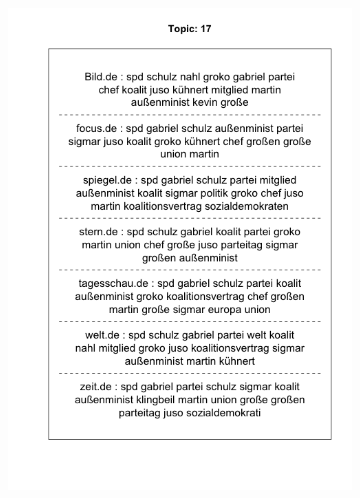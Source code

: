 \documentclass[12pt,a4paper,notitlepage]{article}
\begin{document}
\begin{figure}[H]
\begin{center}
\begin{subfigure}[normla]{0.49\textwidth}
			\includegraphics[width=\textwidth]{figs/plotquote17.png}
		\end{subfigure}
	\end{center}
\end{figure}
\end{document}
